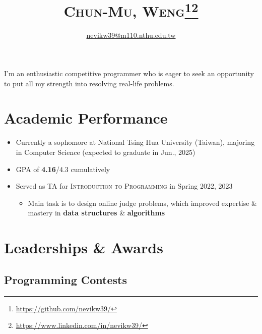\documentclass[12pt, a4paper]{article}
\title{\textsc{Chun-Mu, Weng}\footnote{\url{https://github.com/nevikw39/}}\footnote{\url{https://www.linkedin.com/in/nevikw39/}}}%
\author{\href{mailto:nevikw39@m110.nthu.edu.tw}{\ttfamily nevikw39@m110.nthu.edu.tw}}
\date{}%
\begin{document}
\maketitle

I'm an enthusiastic competitive programmer who is eager to seek an opportunity to put all my strength into resolving real-life problems.

\section{Academic Performance}

%

\begin{itemize}
\item Currently a sophomore at National Tsing Hua University (Taiwan), majoring in \textsf{Computer Science} (expected to graduate in Jun., 2025)
\item GPA of \textbf{4.16}/4.3 cumulatively
\item Served as TA for \textsc{Introduction to Programming \MakeUppercase{}} in Spring 2022, 2023
\begin{itemize}
\item Main task is to design online judge problems, which improved expertise \& mastery in \textbf{data structures} \& \textbf{algorithms}
\end{itemize}
\end{itemize}

\section{Leaderships \& Awards}

\subsection{Programming Contests}

\end{document}
